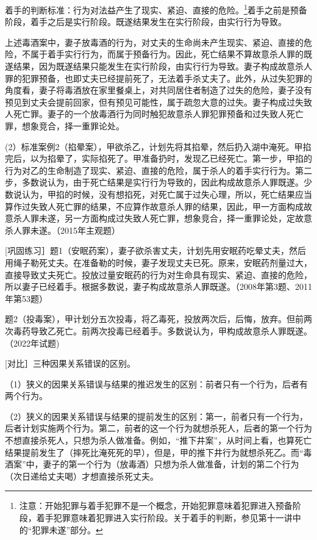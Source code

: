 着手的判断标准：行为对法益产生了现实、紧迫、直接的危险。\footnote{注意：开始犯罪与着手犯罪不是一个概念，开始犯罪意味着犯罪进入预备阶段，着手犯罪意味着犯罪进入实行阶段。关于着手的判断，参见第十一讲中的“犯罪未遂”部分。}着手之前是预备阶段，着手之后是实行阶段。既遂结果发生在实行阶段，由实行行为导致。


上述毒酒案中，妻子放毒酒的行为，对丈夫的生命尚未产生现实、紧迫、直接的危险，不属于着手实行行为，而属于预备行为。因此，死亡结果不算故意杀人罪的既遂结果，因为既遂结果只能发生在实行阶段，由实行行为导致。妻子构成故意杀人罪的犯罪预备，也即丈夫已经提前死了，无法着手杀丈夫了。此外，从过失犯罪的角度看，妻子将毒酒放在家里餐桌上，对共同居住者制造了过失的危险，妻子没有预见到丈夫会提前回家，但有预见可能性，属于疏忽大意的过失。妻子构成过失致人死亡罪。妻子的一个放毒酒行为同时触犯故意杀人罪犯罪预备和过失致人死亡罪，想象竞合，择一重罪论处。

(2）标准案例2（掐晕案），甲欲杀乙，计划先将其掐晕，然后扔入湖中淹死。甲掐完后，以为掐晕了，实际掐死了。甲准备扔时，发现乙已经死亡。第一步，甲掐的行为对乙的生命制造了现实、紧迫、直接的危险，属于杀人的着手实行行为。第二步，多数说认为，由于死亡结果是实行行为导致的，因此构成故意杀人罪既遂。少数说认为，甲掐的时候，没有想掐死，对死亡属于过失心理，所以，死亡结果应当算作过失致人死亡罪的结果，不应算作故意杀人罪的结果，因此，甲一方面构成故意杀人罪未遂，另一方面构成过失致人死亡罪，想象竞合，择一重罪论处，定故意杀人罪未遂。（2015年主观题）

[巩固练习］题1（安眠药案），妻子欲杀害丈夫，计划先用安眠药吃晕丈夫，然后用绳子勒死丈夫。在准备勒的时候，妻子发现丈夫已死。原来，安眠药剂量过大，直接导致丈夫死亡。投放过量安眠药的行为对生命具有现实、紧迫、直接的危险，所以妻子已经着手。根据多数说，妻子构成故意杀人罪既遂。（2008年第3题、2011年第53题）

题2（投毒案），甲计划分五次投毒，将乙毒死，投放两次后，后悔，放弃。但前两次毒药导致乙死亡。前两次投毒已经着手。多数说认为，甲构成故意杀人罪既遂。（2022年试题)


[对比］三种因果关系错误的区别。

（1）狭义的因果关系错误与结果的推迟发生的区别：前者只有一个行为，后者有两个行为。

（2）狭义的因果关系错误与结果的提前发生的区别：第一，前者只有一个行为，后者计划实施两个行为。第二，前者的这一个行为就想杀死人，后者的第一个行为不想直接杀死人，只想为杀人做准备。例如，“推下井案”，从时间上看，也算死亡结果提前发生了（摔死比淹死死的早），但是，甲的推下井行为就想杀死乙。而“毒酒案”中，妻子的第一个行为（放毒酒）只想为杀人做准备，计划的第二个行为（次日递给丈夫喝）才想直接杀死丈夫。

